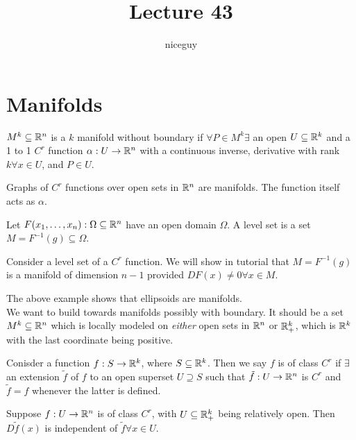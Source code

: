 \documentclass[12pt]{article}
\title{Lecture 43}
\author{niceguy}
\begin{document}
\maketitle

\section{Manifolds}

$M^k \subseteq \mathbb{R}^n$ is a $k$ manifold without boundary if $\forall P \in M^k \exists $ an open $U \subseteq \mathbb{R}^k$ and a 1 to 1 $C^r$ function $\alpha:U \rightarrow \mathbb{R}^n$ with a continuous inverse, derivative with rank $k \forall x \in U$, and $P \in U$.

\begin{ex}
    Graphs of $C^r$ functions over open sets in $\mathbb{R}^n$ are manifolds. The function itself acts as $\alpha$.
\end{ex}

\begin{defn}
    Let $F(x_1,\dots,x_n): \Omega \subseteq \mathbb{R}^n$ have an open domain $\Omega$. A level set is a set $M = F^{-1}(g) \subseteq \Omega$.
\end{defn}

\begin{ex}
    Consider a level set of a $C^r$ function. We will show in tutorial that $M = F^{-1}(g)$ is a manifold of dimension $n-1$ provided $DF(x) \neq 0 \forall x \in M$.
\end{ex}

The above example shows that ellipsoids are manifolds. \\

We want to build towards manifolds possibly with boundary. It should be a set $M^k \subseteq \mathbb{R}^n$ which is locally modeled on \textit{either} open sets in $\mathbb{R}^n$ or $\mathbb{R}^k_+$, which is $\mathbb{R}^k$ with the last coordinate being positive.

\begin{defn}
    Conisder a function $f: S \rightarrow \mathbb{R}^k$, where $S \subseteq \mathbb{R}^k$. Then we say $f$ is of class $C^r$ if $\exists$ an extension $\tilde f$ of $f$ to an open superset $U \supseteq S$ such that $\tilde f:U \rightarrow \mathbb{R}^n$ is $C^r$ and $\tilde f = f$ whenever the latter is defined.
\end{defn}

\begin{lem}
    Suppose $f: U \rightarrow \mathbb{R}^n$ is of class $C^r$, with $U \subseteq \mathbb{R}^k_+$ being relatively open. Then $D\tilde f(x)$ is independent of $\tilde f \forall x \in U$.
\end{lem}
\end{document}
